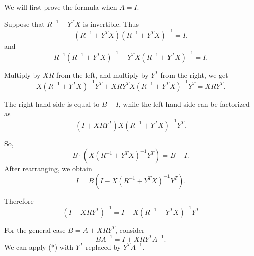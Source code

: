 \documentclass[12pt]{article}
\begin{document}
We will first prove the formula when $A=I$.

Suppose that $R^{-1}+Y^TX$ is invertible. Thus
\[
 (R^{-1}+Y^TX)(R^{-1}+Y^TX)^{-1} = I.
\]
and
\[ R^{-1}(R^{-1}+Y^TX)^{-1}+Y^TX(R^{-1}+Y^TX)^{-1} = I.
\]

Multiply by $XR$ from the left, and multiply by $Y^T$ from the
right, we get
\[ X(R^{-1}+Y^TX)^{-1}Y^T + XR Y^TX(R^{-1}+Y^TX)^{-1}Y^T = XRY^T.
\]

The right hand side is equal to $B-I$, while the left hand side can
be factorized as
\[
 (I+XRY^T)X(R^{-1}+Y^TX)^{-1}Y^T.
\]

So,
\[
 B\cdot (X(R^{-1}+Y^TX)^{-1}Y^T) = B-I.
\]
After rearranging, we obtain
\[
I =  B(I-X(R^{-1}+Y^TX)^{-1}Y^T).
\]

Therefore \begin{equation} (I+XRY^T)^{-1}  =
I-X(R^{-1}+Y^TX)^{-1}Y^T \tag{*}
\end{equation}

For the general case $B=A+XRY^T$, consider
\[
 BA^{-1} = I+XRY^TA^{-1}.
\]
We can apply (*) with $Y^T$ replaced by $Y^TA^{-1}$.
\end{document}

